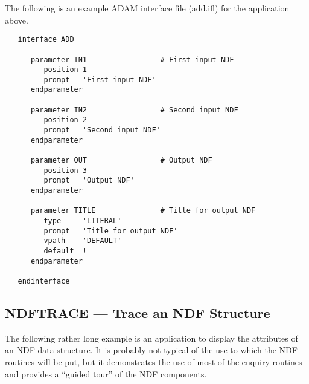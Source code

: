 \documentclass[twoside,11pt]{article}
\newcommand{\xref}[3]{#1}
\newcommand{\xlabel}[1]{}
\begin{document}
The following is an example \xref{ADAM}{sg4}{} interface file
(add.ifl) for the application above. 

\small
\begin{verbatim}
   interface ADD

      parameter IN1                 # First input NDF
         position 1
         prompt   'First input NDF'
      endparameter

      parameter IN2                 # Second input NDF
         position 2
         prompt   'Second input NDF'
      endparameter

      parameter OUT                 # Output NDF
         position 3
         prompt   'Output NDF'
      endparameter

      parameter TITLE               # Title for output NDF
         type     'LITERAL'
         prompt   'Title for output NDF'
         vpath    'DEFAULT'
         default  !
      endparameter

   endinterface
\end{verbatim}
\normalsize

\newpage
\subsection{\xlabel{NDFTRACE}\label{ss:tracingndf}NDFTRACE --- Trace an NDF Structure}

The following rather long example is an application to display the attributes of
an NDF data structure. 
It is probably not typical of the use to which the NDF\_ routines will be
put, but it demonstrates the use of most of the enquiry routines and
provides a ``guided tour'' of the NDF components.
\end{document}
